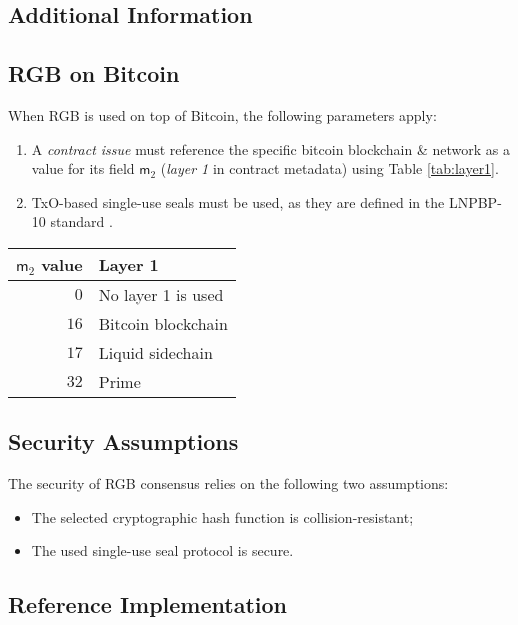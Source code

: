 \documentclass[9pt,oneside]{amsart}
\newenvironment{coltable}
  {\par\bigskip\noindent\minipage{\columnwidth}\centering}
  {\endminipage\par\bigskip}
\begin{document}
\begin{multicols}{2}
\section{Additional Information}
\subsection{RGB on Bitcoin}

When RGB is used on top of Bitcoin, the following parameters apply:

\begin{enumerate}
\item A \emph{contract issue} must reference the specific bitcoin blockchain \& network as a value for its
field $\mathsf{m}_2$ (\emph{layer 1} in contract metadata) using Table \ref{tab:layer1}.
\item TxO-based single-use seals must be used, as they are defined in the LNPBP-10 standard \cite{LNPBP10}.
\end{enumerate}

\begin{coltable}
\label{tab:layer1}
\begin{tabular}{r l}
\toprule
$\mathsf{m}_2$ value & Layer 1 \\
\midrule
$0$ & No layer 1 is used \\
$16$ & Bitcoin blockchain \\
$17$ & Liquid sidechain \\
$32$ & Prime \\
\bottomrule
\end{tabular}
\end{coltable}


\subsection{Security Assumptions}

The security of RGB consensus relies on the following two assumptions:

\begin{itemize}
\item The selected cryptographic hash function is collision-resistant;
\item The used single-use seal protocol is secure.
\end{itemize}

\subsection{Reference Implementation}


\end{multicols}
\end{document}
